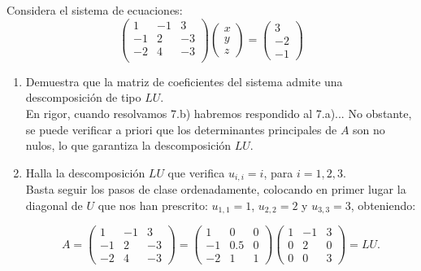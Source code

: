 \documentclass[12pt]{article}
\begin{document}
	\begin{ejercicio}
		Considera el sistema de ecuaciones:
		$$ \begin{pmatrix}
			1 & -1 & 3 \\
			-1 & 2 & -3 \\
			-2 & 4 & -3 \\
		\end{pmatrix} 
		\begin{pmatrix}
			x \\
			y \\
			z
		\end{pmatrix} = 
		\begin{pmatrix}
			3 \\
			-2 \\
			-1
		\end{pmatrix}$$
		
		\begin{enumerate}[label=\alph*)] 
			\item Demuestra que la matriz de coeficientes del sistema admite una descomposición de tipo $LU$. \\
			
				En rigor, cuando resolvamos 7.b) habremos respondido al 7.a)... No obstante, se puede verificar a priori
				que los determinantes principales de $A$ son no nulos, lo que garantiza la descomposición $LU$.
			
			\item Halla la descomposición $LU$ que verifica $u_{i,i} = i$, para $i = 1, 2, 3$. \\
			
				Basta seguir los pasos de clase ordenadamente, colocando en primer lugar la diagonal de $U$ que nos
				han prescrito: $u_{1,1} = \boxed{1}$, $u_{2,2} = \boxed{2}$ y $u_{3,3} = \boxed{3}$, obteniendo:
				
				$$A =
				\begin{pmatrix}
					1 & -1 & 3 \\
					-1 & 2 & -3 \\
					-2 & 4 & -3
				\end{pmatrix}
				=
				\begin{pmatrix}
					1 & 0 & 0 \\
					-1 & 0.5 & 0 \\
					-2 & 1 & 1
				\end{pmatrix}
				\begin{pmatrix}
					\boxed{1} & -1 & 3 \\
					0 & \boxed{2} & 0 \\
					0 & 0 & \boxed{3}
				\end{pmatrix}
				= LU.$$
				

\end{enumerate}
\end{ejercicio}
\end{document}
